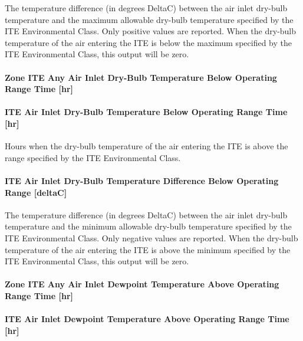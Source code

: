 The temperature difference (in degrees DeltaC) between the air inlet dry-bulb temperature and the maximum allowable dry-bulb temperature specified by the ITE Environmental Class. Only positive values are reported. When the dry-bulb temperature of the air entering the ITE is below the maximum specified by the ITE Environmental Class, this output will be zero.

\paragraph{Zone ITE Any Air Inlet Dry-Bulb Temperature Below Operating Range Time {[}hr{]}}\label{zone-ite-any-air-inlet-dry-bulb-temperature-below-operating-range-time-hr}

\paragraph{ITE Air Inlet Dry-Bulb Temperature Below Operating Range Time {[}hr{]}}\label{ite-air-inlet-dry-bulb-temperature-below-operating-range-time-hr}

Hours when the dry-bulb temperature of the air entering the ITE is above the range specified by the ITE Environmental Class.

\paragraph{ITE Air Inlet Dry-Bulb Temperature Difference Below Operating Range {[}deltaC{]}}\label{ite-air-inlet-dry-bulb-temperature-difference-below-operating-range-deltac}

The temperature difference (in degrees DeltaC) between the air inlet dry-bulb temperature and the minimum allowable dry-bulb temperature specified by the ITE Environmental Class. Only negative values are reported. When the dry-bulb temperature of the air entering the ITE is above the minimum specified by the ITE Environmental Class, this output will be zero.

\paragraph{Zone ITE Any Air Inlet Dewpoint Temperature Above Operating Range Time {[}hr{]}}\label{zone-ite-any-air-inlet-dewpoint-temperature-above-operating-range-time-hr}

\paragraph{ITE Air Inlet Dewpoint Temperature Above Operating Range Time {[}hr{]}}\label{ite-air-inlet-dewpoint-temperature-above-operating-range-time-hr}

